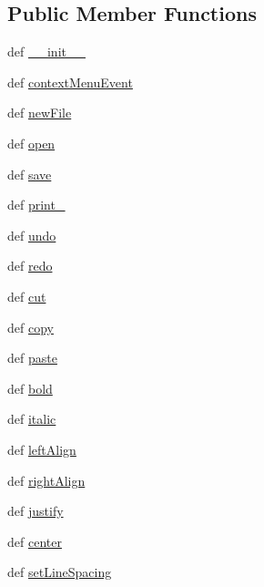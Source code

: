 \subsection*{Public Member Functions}
\begin{DoxyCompactItemize}
\item 
def \hyperlink{classmenus_1_1MainWindow_af1126af443dda698bd7ba92670e71c76}{\+\_\+\+\_\+init\+\_\+\+\_\+}
\item 
def \hyperlink{classmenus_1_1MainWindow_a6ee70cbe7329cee9f94416d302c74dd8}{context\+Menu\+Event}
\item 
def \hyperlink{classmenus_1_1MainWindow_ac452e36b237b13bec84cfd648c5a89b8}{new\+File}
\item 
def \hyperlink{classmenus_1_1MainWindow_a9f0da415a7121c9e687b0921d1ed8da3}{open}
\item 
def \hyperlink{classmenus_1_1MainWindow_a84a51e4ebaf3d1f6e07bf61d38ed3aa6}{save}
\item 
def \hyperlink{classmenus_1_1MainWindow_a6a11c30f7ba7900b8a8664d12d907e81}{print\+\_\+}
\item 
def \hyperlink{classmenus_1_1MainWindow_ab1c88904b8a22f9c41cba1492c85ae9a}{undo}
\item 
def \hyperlink{classmenus_1_1MainWindow_aef4f952b07b269a392cc396bd99ea5be}{redo}
\item 
def \hyperlink{classmenus_1_1MainWindow_adee5de5d28eaefabbfdc34405681e0a0}{cut}
\item 
def \hyperlink{classmenus_1_1MainWindow_ab36ee665a36356d81f43b67d1ac01803}{copy}
\item 
def \hyperlink{classmenus_1_1MainWindow_ade1418c48daa75f22c0fe46d8788ac94}{paste}
\item 
def \hyperlink{classmenus_1_1MainWindow_ac3760f5a6e5f645f8cf57afa6efe1aaf}{bold}
\item 
def \hyperlink{classmenus_1_1MainWindow_af232493764326a2f1d300eb49ad9cca0}{italic}
\item 
def \hyperlink{classmenus_1_1MainWindow_a6052e88b280d458962cbf7fcf8083098}{left\+Align}
\item 
def \hyperlink{classmenus_1_1MainWindow_a103c424fd75121b52e149d5815edffef}{right\+Align}
\item 
def \hyperlink{classmenus_1_1MainWindow_aa19699e2192848d99a11fa9d3cbbb2a0}{justify}
\item 
def \hyperlink{classmenus_1_1MainWindow_a44868f4f7d7e52df421a1c9cf70d56fe}{center}
\item 
def \hyperlink{classmenus_1_1MainWindow_a0c82931d26bdf8ff34af6554231f8f97}{set\+Line\+Spacing}

\end{DoxyCompactItemize}
